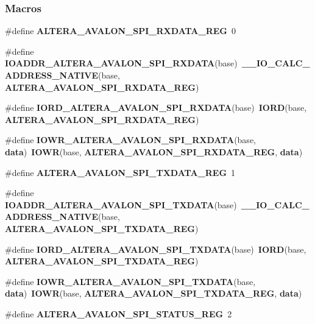 \subsubsection*{Macros}
\begin{DoxyCompactItemize}
\item 
\#define {\bf A\+L\+T\+E\+R\+A\+\_\+\+A\+V\+A\+L\+O\+N\+\_\+\+S\+P\+I\+\_\+\+R\+X\+D\+A\+T\+A\+\_\+\+R\+EG}~0
\item 
\#define {\bf I\+O\+A\+D\+D\+R\+\_\+\+A\+L\+T\+E\+R\+A\+\_\+\+A\+V\+A\+L\+O\+N\+\_\+\+S\+P\+I\+\_\+\+R\+X\+D\+A\+TA}(base)~{\bf \+\_\+\+\_\+\+I\+O\+\_\+\+C\+A\+L\+C\+\_\+\+A\+D\+D\+R\+E\+S\+S\+\_\+\+N\+A\+T\+I\+VE}(base, {\bf A\+L\+T\+E\+R\+A\+\_\+\+A\+V\+A\+L\+O\+N\+\_\+\+S\+P\+I\+\_\+\+R\+X\+D\+A\+T\+A\+\_\+\+R\+EG})
\item 
\#define {\bf I\+O\+R\+D\+\_\+\+A\+L\+T\+E\+R\+A\+\_\+\+A\+V\+A\+L\+O\+N\+\_\+\+S\+P\+I\+\_\+\+R\+X\+D\+A\+TA}(base)~{\bf I\+O\+RD}(base, {\bf A\+L\+T\+E\+R\+A\+\_\+\+A\+V\+A\+L\+O\+N\+\_\+\+S\+P\+I\+\_\+\+R\+X\+D\+A\+T\+A\+\_\+\+R\+EG})
\item 
\#define {\bf I\+O\+W\+R\+\_\+\+A\+L\+T\+E\+R\+A\+\_\+\+A\+V\+A\+L\+O\+N\+\_\+\+S\+P\+I\+\_\+\+R\+X\+D\+A\+TA}(base,  {\bf data})~{\bf I\+O\+WR}(base, {\bf A\+L\+T\+E\+R\+A\+\_\+\+A\+V\+A\+L\+O\+N\+\_\+\+S\+P\+I\+\_\+\+R\+X\+D\+A\+T\+A\+\_\+\+R\+EG}, {\bf data})
\item 
\#define {\bf A\+L\+T\+E\+R\+A\+\_\+\+A\+V\+A\+L\+O\+N\+\_\+\+S\+P\+I\+\_\+\+T\+X\+D\+A\+T\+A\+\_\+\+R\+EG}~1
\item 
\#define {\bf I\+O\+A\+D\+D\+R\+\_\+\+A\+L\+T\+E\+R\+A\+\_\+\+A\+V\+A\+L\+O\+N\+\_\+\+S\+P\+I\+\_\+\+T\+X\+D\+A\+TA}(base)~{\bf \+\_\+\+\_\+\+I\+O\+\_\+\+C\+A\+L\+C\+\_\+\+A\+D\+D\+R\+E\+S\+S\+\_\+\+N\+A\+T\+I\+VE}(base, {\bf A\+L\+T\+E\+R\+A\+\_\+\+A\+V\+A\+L\+O\+N\+\_\+\+S\+P\+I\+\_\+\+T\+X\+D\+A\+T\+A\+\_\+\+R\+EG})
\item 
\#define {\bf I\+O\+R\+D\+\_\+\+A\+L\+T\+E\+R\+A\+\_\+\+A\+V\+A\+L\+O\+N\+\_\+\+S\+P\+I\+\_\+\+T\+X\+D\+A\+TA}(base)~{\bf I\+O\+RD}(base, {\bf A\+L\+T\+E\+R\+A\+\_\+\+A\+V\+A\+L\+O\+N\+\_\+\+S\+P\+I\+\_\+\+T\+X\+D\+A\+T\+A\+\_\+\+R\+EG})
\item 
\#define {\bf I\+O\+W\+R\+\_\+\+A\+L\+T\+E\+R\+A\+\_\+\+A\+V\+A\+L\+O\+N\+\_\+\+S\+P\+I\+\_\+\+T\+X\+D\+A\+TA}(base,  {\bf data})~{\bf I\+O\+WR}(base, {\bf A\+L\+T\+E\+R\+A\+\_\+\+A\+V\+A\+L\+O\+N\+\_\+\+S\+P\+I\+\_\+\+T\+X\+D\+A\+T\+A\+\_\+\+R\+EG}, {\bf data})
\item 
\#define {\bf A\+L\+T\+E\+R\+A\+\_\+\+A\+V\+A\+L\+O\+N\+\_\+\+S\+P\+I\+\_\+\+S\+T\+A\+T\+U\+S\+\_\+\+R\+EG}~2

\end{DoxyCompactItemize}
